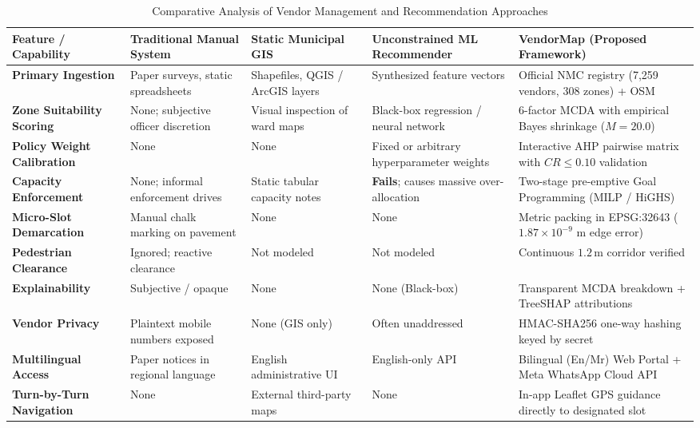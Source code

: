 \begin{table}[t]
\caption{Comparative Analysis of Vendor Management and Recommendation Approaches}
\label{tab:comparison_approaches}
\centering
\small
\begin{tabularx}{\textwidth}{lXXXX}
\toprule
\textbf{Feature / Capability} & \textbf{Traditional Manual System} & \textbf{Static Municipal GIS} & \textbf{Unconstrained ML Recommender} & \textbf{VendorMap (Proposed Framework)} \\
\midrule
\textbf{Primary Ingestion} & Paper surveys, static spreadsheets & Shapefiles, QGIS / ArcGIS layers & Synthesized feature vectors & Official NMC registry (7,259 vendors, 308 zones) + OSM \\
\textbf{Zone Suitability Scoring} & None; subjective officer discretion & Visual inspection of ward maps & Black-box regression / neural network & 6-factor MCDA with empirical Bayes shrinkage ($M=20.0$) \\
\textbf{Policy Weight Calibration} & None & None & Fixed or arbitrary hyperparameter weights & Interactive AHP pairwise matrix with $CR \le 0.10$ validation \\
\textbf{Capacity Enforcement} & None; informal enforcement drives & Static tabular capacity notes & \textbf{Fails}; causes massive over-allocation & Two-stage pre-emptive Goal Programming (MILP / HiGHS) \\
\textbf{Micro-Slot Demarcation} & Manual chalk marking on pavement & None & None & Metric packing in EPSG:32643 ($1.87 \times 10^{-9}\text{ m}$ edge error) \\
\textbf{Pedestrian Clearance} & Ignored; reactive clearance & Not modeled & Not modeled & Continuous $1.2\,\text{m}$ corridor verified \\
\textbf{Explainability} & Subjective / opaque & None & None (Black-box) & Transparent MCDA breakdown + TreeSHAP attributions \\
\textbf{Vendor Privacy} & Plaintext mobile numbers exposed & None (GIS only) & Often unaddressed & HMAC-SHA256 one-way hashing keyed by secret \\
\textbf{Multilingual Access} & Paper notices in regional language & English administrative UI & English-only API & Bilingual (En/Mr) Web Portal + Meta WhatsApp Cloud API \\
\textbf{Turn-by-Turn Navigation} & None & External third-party maps & None & In-app Leaflet GPS guidance directly to designated slot \\
\bottomrule
\end{tabularx}
\end{table}


